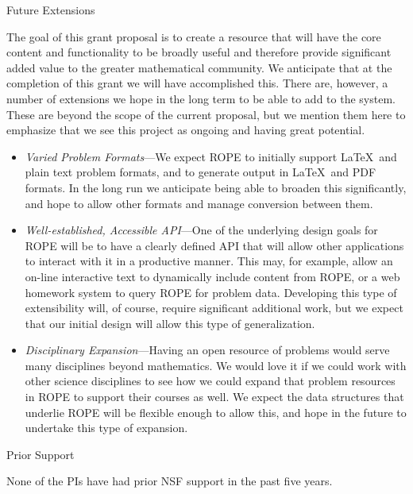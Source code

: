 \documentclass[11pt]{article}
\begin{document}
\begin{section}{Future Extensions}

The goal of this grant proposal is to create a resource that will have the
core content and functionality to be broadly useful and therefore provide
significant added value to the greater mathematical community.  We
anticipate that at the completion of this grant we will have accomplished
this.  There are, however, a number of extensions we hope in the long term
to be able to add to the system.  These are beyond the scope of the
current proposal, but we mention them here to emphasize that we see this
project as ongoing and having great potential.

\begin{itemize}
  \item
    \emph{Varied Problem Formats}---We expect ROPE to initially support
    \LaTeX\ and plain text problem formats, and to generate output in
    \LaTeX\ and PDF formats.  In the long run we anticipate being able to
    broaden this significantly, and hope to allow other formats and manage
    conversion between them.
  \item
    \emph{Well-established, Accessible API}---One of the underlying design
    goals for ROPE will be to have a clearly defined API that will allow
    other applications to interact with it in a productive manner.  This
    may, for example, allow an on-line interactive text to dynamically
    include content from ROPE, or a web homework system to query ROPE for
    problem data.  Developing this type of extensibility will, of course,
    require significant additional work, but we expect that our initial
    design will allow this type of generalization.
  \item
    \emph{Disciplinary Expansion}---Having an open resource of problems
    would serve many disciplines beyond mathematics.  We would love it if
    we could work with other science disciplines to see how we could
    expand that problem resources in ROPE to support their courses as
    well.  We expect the data structures that underlie ROPE will be
    flexible enough to allow this, and hope in the future to undertake
    this type of expansion.
\end{itemize}

\end{section}

\begin{section}{Prior Support}

None of the PIs have had prior NSF support in the past five years.

\end{section}
\end{document}
